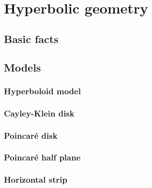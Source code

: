 \chapter{Hyperbolic geometry}
\label{chap:hyperbolic_geometry}

\section{Basic facts}
\section{Models}
\subsection{Hyperboloid model}
\subsection{Cayley-Klein disk}
\subsection{Poincaré disk}
\subsection{Poincaré half plane}
\subsection{Horizontal strip}
